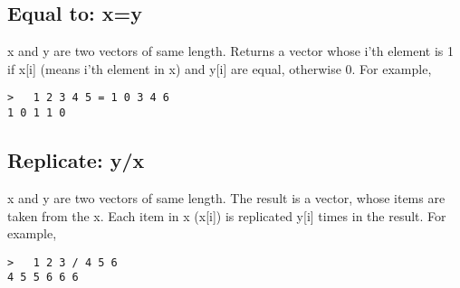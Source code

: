 \documentclass[a4paper]{article}
\begin{document}
\subsection{Equal to: x=y}

x and y are two vectors of same length. Returns a vector whose i'th
 element is 1 if x[i] (means i'th element in x) and y[i] are equal,
 otherwise 0. For example,
\begin{verbatim}
>   1 2 3 4 5 = 1 0 3 4 6
1 0 1 1 0
\end{verbatim}

\subsection{Replicate: y/x}

x and y are two vectors of same length. The result is a vector, whose
items are taken from the x. Each item in x (x[i]) is replicated y[i]
times in the result. For example,
\begin{verbatim}
>   1 2 3 / 4 5 6
4 5 5 6 6 6
\end{verbatim}
\end{document}
